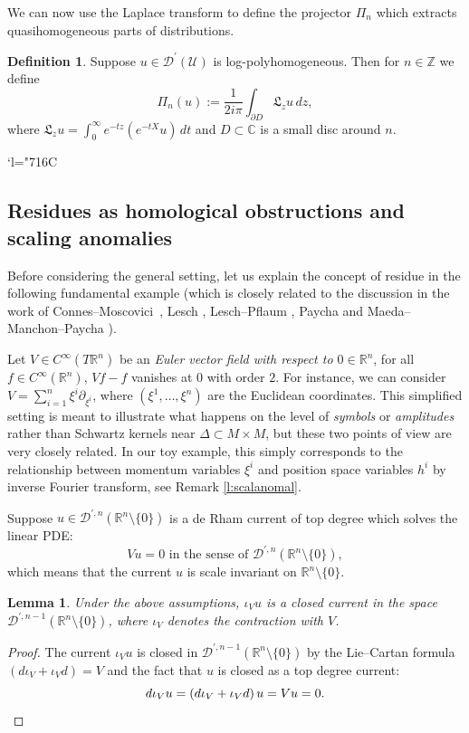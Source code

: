 \documentclass[JEP,XML,SOM,Unicode]{cedram}
\let\pazocal\mathscr
\newcommand{\Changelback}{\mathcode`l="716C}
\newtheorem{lemma}[theorem]{Lemma}
\theoremstyle{definition}
\newtheorem{definition}[theorem]{Definition}
\newcommand\rr{{\mathbb R}}
\newcommand\zz{{\mathbb Z}}
\newcommand\cD{{\pazocal D}}
\let\euler X
\let\Feuler V
\let\exd u
\newcommand*{\defeq}{:=}
\newcommand\Cf{C^\infty}
\begin{document}
We can now use the Laplace transform to define
the projector $\Pi_n$ which extracts quasihomogeneous parts of distributions.

\begin{definition} \label{def:pi}
Suppose $u\in \cD^\prime(\pazocal{U})$ is log-polyhomogeneous. Then for $n\in\zz$ we define
\[
\Pi_n(u)\defeq \frac{1}{2i\pi}\int_{\partial D} \mathfrak{L}_zu \,dz,
\]
where $ \mathfrak{L}_z u= \int_0^\infty e^{-tz}(e^{-t\euler}u) \,dt$ and $D\subset \mathbb{C}$ is a small disc around $n$.
\end{definition}
\Changelback

\subsection{Residues as homological obstructions and scaling anomalies}\label{ss:toy}

Before considering the general setting, let us explain the concept of residue in the following fundamental example (which is closely related to the discussion in the work of Connes--Moscovici~\cite[\S5]{Connes1995}, Lesch \cite{Lesch}, Lesch--Pflaum \cite{Lesch2000}, Paycha \cite{paycha2,paycha} and Maeda--Manchon--Paycha \cite{Maeda2005}).

Let $\Feuler\in {\Cf(T\rr^{n})}$ be an \emph{Euler vector field with respect to $0\in \rr^{n}$}, \ie for all $f\in\Cf(\rr^{n})$, $\Feuler f-f$ vanishes at $0$ with order $2$. For instance, we can consider $\Feuler=\sum_{i=1}^n \xi^i \partial_{\xi^i}$, where $(\xi^1,\dots,\xi^n)$ are the Euclidean coordinates. This simplified setting is meant to illustrate what happens on the level of \emph{symbols} or \emph{amplitudes} rather than Schwartz kernels near $\Delta\subset M\times M$, but these two points of view are very closely related. In our toy example, this simply corresponds to the relationship between momentum variables $\xi^{i}$ and position space variables $h^{i}$ by inverse Fourier transform, see Remark \ref{l:scalanomal}.

Suppose $\exd\in \pazocal{D}^{\prime,n}(\rr^n\setminus\{0\})$ is a de Rham current of top degree
which solves the linear PDE:
\begin{equation}\label{toextend}
\Feuler \exd=0 \text{ in the sense of } \pazocal{D}^{\prime,n}(\rr^n\setminus \{0\}),
\end{equation}
which
means that the current $\exd$ is scale invariant on $\rr^n\setminus \{0\}$.
\begin{lemma}
Under the above assumptions, $\iota_\Feuler \exd$ is a closed current in
the space $\pazocal{D}^{\prime,n-1}(\rr^n\setminus \{0\})$, where $\iota_\Feuler$ denotes the contraction with $\Feuler$.
\end{lemma}
\begin{proof}
The current $\iota_\Feuler \exd$ is closed in $\pazocal{D}^{\prime,n-1}(\rr^n\setminus \{0\}) $
by the
Lie--Cartan formula $\left(d\iota_\Feuler+\iota_\Feuler d \right)=\Feuler$ and the fact that $\exd$ is closed as a top degree current:
\[
d\iota_\Feuler {\exd}=\left(d\iota_\Feuler+\iota_\Feuler d \right)\exd=\Feuler \exd=0.\qedhere
\]
\end{proof}
\end{document}

